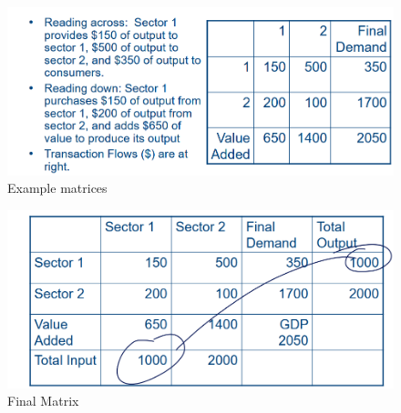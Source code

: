 \begin{figure}
\centering
\includegraphics{image-7.png}
\caption{Example matrices}
\end{figure}

\begin{figure}
\centering
\includegraphics{image-8.png}
\caption{Final Matrix}
\end{figure}

